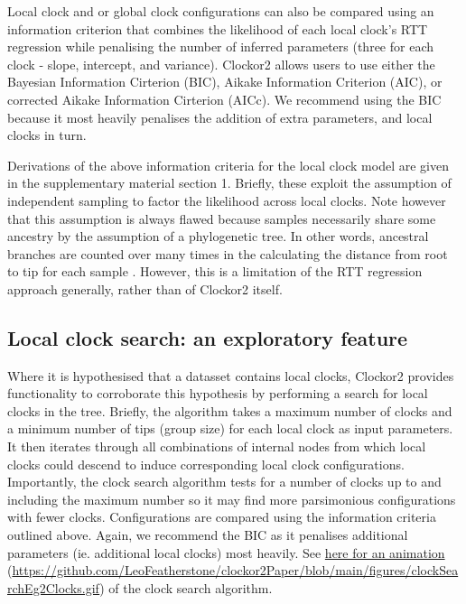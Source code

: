 \documentclass{article}
\begin{document}
Local clock and or global clock configurations can also be compared using an information criterion that combines the likelihood of each local clock's RTT regression while penalising the number of inferred parameters (three for each clock - slope, intercept, and variance). Clockor2 allows users to use either the Bayesian Information Cirterion (BIC), Aikake Information Criterion (AIC), or corrected Aikake Information Cirterion (AICc). We recommend using the BIC because it most heavily penalises the addition of extra parameters, and local clocks in turn.

Derivations of the above information criteria for the local clock model are given in the supplementary material section 1. Briefly, these exploit the assumption of independent sampling to factor the likelihood across local clocks. Note however that this assumption is always flawed because samples necessarily share some ancestry by the assumption of a phylogenetic tree. In other words, ancestral branches are counted over many times in the calculating the distance from root to tip for each sample \citep{duchene_2016_estimating}. However, this is a limitation of the RTT regression approach generally, rather than of Clockor2 itself.

\subsection*{{Local clock search: an exploratory feature}}
Where it is hypothesised that a datasset contains local clocks, Clockor2 provides functionality to corroborate this hypothesis by performing a search for local clocks in the tree. Briefly, the algorithm takes a maximum number of clocks and a minimum number of tips (group size) for each local clock as input parameters. It then iterates through all combinations of internal nodes from which local clocks could descend to induce corresponding local clock configurations. Importantly, the clock search algorithm tests for a number of clocks up to and including the maximum number so it may find more parsimonious configurations with fewer clocks. Configurations are compared using the information criteria outlined above. Again, we recommend the BIC as it penalises additional parameters (ie. additional local clocks) most heavily. See \href{https://github.com/LeoFeatherstone/clockor2Paper/blob/main/figures/clockSearchEg2Clocks.gif}{here for an animation} (\url{https://github.com/LeoFeatherstone/clockor2Paper/blob/main/figures/clockSearchEg2Clocks.gif}) of the clock search algorithm. 
\end{document}
